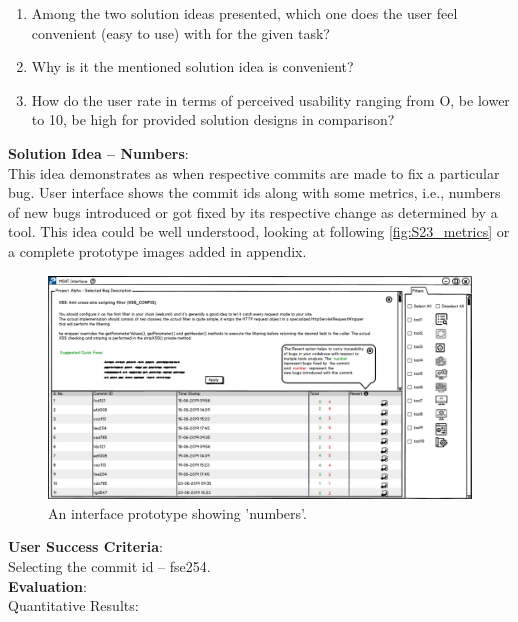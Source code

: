 \begin{enumerate}
\item Among the two solution ideas presented, which one does the user feel convenient (easy to use) with for the given task?
\item Why is it the mentioned solution idea is convenient?
\item How do the user rate in terms of perceived usability ranging from O, be lower to 10, be high for provided solution designs in comparison?
\end{enumerate}

\textbf{Solution Idea – Numbers}: \\

This idea demonstrates as when respective commits are made to fix a particular bug. User interface shows the commit ids along with some metrics, i.e., numbers of new bugs introduced or got fixed by its respective change as determined by a tool. This idea could be well understood, looking at following \autoref{fig:S23_metrics} or a complete prototype images added in appendix. \\


\begin{figure}[hbt!]
	\centering
	\includegraphics[width=\linewidth]{figures/solution_ideas_snaps/S23_metrics}
	\caption{An interface prototype showing 'numbers'.}
	\label{fig:S23_metrics}
\end{figure}

\textbf{User Success Criteria}: \\

Selecting the commit id – fse254. \\

\textbf{Evaluation}: \\

Quantitative Results: \\

